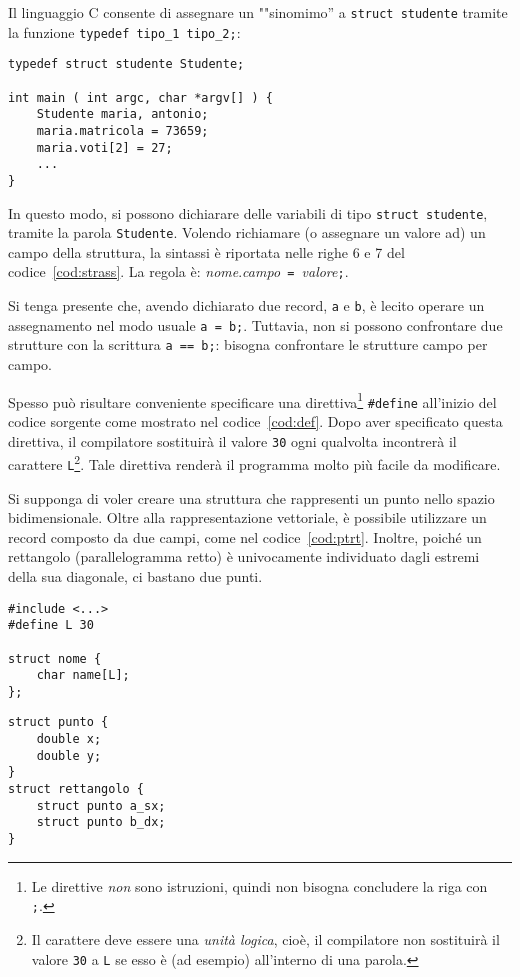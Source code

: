 Il linguaggio C consente di assegnare un ""sinomimo'' a \lstinline!struct studente! tramite la funzione \lstinline!typedef tipo_1 tipo_2;!:
\begin{lstlisting}[caption={\em \lstinline!typedef! e assegnamenti.}, label={cod:strass}]
typedef struct studente Studente;

int main ( int argc, char *argv[] ) {
	Studente maria, antonio;
	maria.matricola = 73659;
	maria.voti[2] = 27;
	...
}
\end{lstlisting}
In questo modo, si possono dichiarare delle variabili di tipo \lstinline!struct studente!, tramite la parola \lstinline!Studente!. Volendo richiamare (o assegnare un valore ad) un campo della struttura, la sintassi è riportata nelle righe 6 e 7 del codice~\vref{cod:strass}. La regola è: \emph{nome}.\emph{campo}\texttt{ = }\emph{valore}\texttt{;}.

Si tenga presente che, avendo dichiarato due record, \lstinline!a! e \lstinline!b!, è lecito operare un assegnamento nel modo usuale \lstinline!a = b;!. Tuttavia, non si possono confrontare due strutture con la scrittura \lstinline!a == b;!: bisogna confrontare le strutture campo per campo.

Spesso  può risultare conveniente specificare una direttiva\footnote{Le direttive \emph{non} sono istruzioni, quindi non bisogna concludere la riga con \lstinline!;!.} \lstinline!#define! all'inizio del codice sorgente come mostrato nel codice~\vref{cod:def}. Dopo aver specificato questa direttiva, il compilatore sostituirà il valore \lstinline!30! ogni qualvolta incontrerà il carattere \lstinline!L!\footnote{Il carattere deve essere una \emph{unità logica}, cioè, il compilatore non sostituirà il valore \lstinline!30! a \lstinline!L! se esso è (ad esempio) all'interno di una parola.}. Tale direttiva renderà il programma molto più facile da modificare.

Si supponga di voler creare una struttura che rappresenti un punto nello spazio bidimensionale. Oltre alla rappresentazione vettoriale, è possibile utilizzare un record composto da due campi, come nel codice~\vref{cod:ptrt}. Inoltre, poiché un rettangolo (parallelogramma retto) è univocamente individuato dagli estremi della sua diagonale, ci bastano due punti.
\begin{code}
\begin{minipage}{0.45\columnwidth}
	\begin{lstlisting}[caption={\em La direttiva \lstinline?\#define?.}, label={cod:def}]
#include <...>
#define L 30

struct nome {
	char name[L];
};
	\end{lstlisting}
\end{minipage}	\hfill
\begin{minipage}{0.45\columnwidth}
	\begin{lstlisting}[caption={\em Punto e rettangolo.}, label={cod:ptrt}]
struct punto {
	double x;
	double y;
}
struct rettangolo {
	struct punto a_sx;
	struct punto b_dx;
}
	\end{lstlisting}
\end{minipage}

\end{code}

